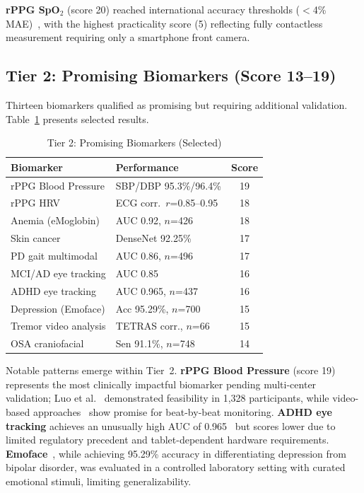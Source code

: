 \documentclass[conference]{IEEEtran}
\begin{document}
\textbf{rPPG SpO$_2$} (score 20) reached international accuracy thresholds ($<$4\% MAE)~\cite{cheng2024contactless}, with the highest practicality score (5) reflecting fully contactless measurement requiring only a smartphone front camera.

\subsection{Tier 2: Promising Biomarkers (Score 13--19)}

Thirteen biomarkers qualified as promising but requiring additional validation. Table~\ref{tab:tier2} presents selected results.

\begin{table}[t]
\caption{Tier 2: Promising Biomarkers (Selected)}
\label{tab:tier2}
\centering
\small
\begin{tabular}{p{2.5cm}p{2.5cm}c}
\toprule
\textbf{Biomarker} & \textbf{Performance} & \textbf{Score} \\
\midrule
rPPG Blood Pressure & SBP/DBP 95.3\%/96.4\% & 19 \\
rPPG HRV & ECG corr.\ $r$=0.85--0.95 & 18 \\
Anemia (eMoglobin) & AUC 0.92, $n$=426 & 18 \\
Skin cancer & DenseNet 92.25\% & 17 \\
PD gait multimodal & AUC 0.86, $n$=496 & 17 \\
MCI/AD eye tracking & AUC 0.85 & 16 \\
ADHD eye tracking & AUC 0.965, $n$=437 & 16 \\
Depression (Emoface) & Acc 95.29\%, $n$=700 & 15 \\
Tremor video analysis & TETRAS corr., $n$=66 & 15 \\
OSA craniofacial & Sen 91.1\%, $n$=748 & 14 \\
\bottomrule
\end{tabular}
\end{table}

Notable patterns emerge within Tier~2. \textbf{rPPG Blood Pressure} (score 19) represents the most clinically impactful biomarker pending multi-center validation; Luo et al.~\cite{luo2019smartphone} demonstrated feasibility in 1,328 participants, while video-based approaches~\cite{videobp2024} show promise for beat-by-beat monitoring. \textbf{ADHD eye tracking} achieves an unusually high AUC of 0.965~\cite{adhdbiomarker2024} but scores lower due to limited regulatory precedent and tablet-dependent hardware requirements. \textbf{Emoface}~\cite{emoface2025}, while achieving 95.29\% accuracy in differentiating depression from bipolar disorder, was evaluated in a controlled laboratory setting with curated emotional stimuli, limiting generalizability.
\end{document}
